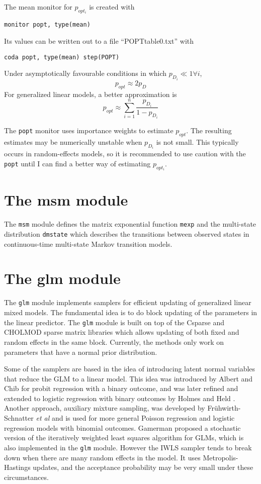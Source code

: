 \documentclass[11pt, a4paper, titlepage]{report}
\begin{document}
The mean monitor for $p_{opt_i}$ is created with
\begin{verbatim}
monitor popt, type(mean)
\end{verbatim}
Its values can be written out to a file ``POPTtable0.txt'' with
\begin{verbatim}
coda popt, type(mean) step(POPT)
\end{verbatim}
Under asymptotically favourable conditions in which $p_{D_i} \ll 1
\forall i$,
\[
p_{opt} \approx 2 p_D
\]
For generalized linear models, a better approximation is
\[
p_{opt} \approx \sum_{i=1}^n \frac {p_{D_i}}{1 - p_{D_i}}
\]

The \verb+popt+ monitor uses importance weights to estimate
$p_{opt}$. The resulting estimates may be numerically unstable when
$p_{D_i}$ is not small.  This typically occurs in random-effects
models, so it is recommended to use caution with the \verb+popt+
until I can find a better way of estimating $p_{opt_i}$.

\section{The msm module}

The \verb+msm+ module defines the matrix exponential function
\verb+mexp+ and the multi-state distribution \verb+dmstate+ which
describes the transitions between observed states in continuous-time
multi-state Markov transition models. 

\section{The glm module}

The \verb+glm+ module implements samplers for efficient updating of
generalized linear mixed models.  The fundamental idea is to do block
updating of the parameters in the linear predictor.  The \verb+glm+
module is built on top of the \textsf{Csparse} and \textsf{CHOLMOD}
sparse matrix libraries
\cite{Davis2006, Davis1999} which allows updating of both fixed and random
effects in the same block. Currently, the methods only work on
parameters that have a normal prior distribution.

Some of the samplers are based in the idea of introducing latent
normal variables that reduce the GLM to a linear model. This idea was
introduced by Albert and Chib \cite{AlbertChib93} for probit
regression with a binary outcome, and was later refined and extended
to logistic regression with binary outcomes by Holmes and Held
\cite{HolmesHeld06}. Another approach, auxiliary mixture sampling,
was developed by Fr{\"u}hwirth-Schnatter {\em et al}
\cite{Fruhwirth-Schnatter09} and is used for more general Poisson
regression and logistic regression models with binomial outcomes.
Gamerman \cite{Gamerman97} proposed a stochastic version of the iteratively
weighted least squares algorithm for GLMs, which is also implemented
in the \verb+glm+ module. However the IWLS sampler tends to break down
when there are many random effects in the model. It uses
Metropolis-Hastings updates, and the acceptance probability may be
very small under these circumstances.
\end{document}
